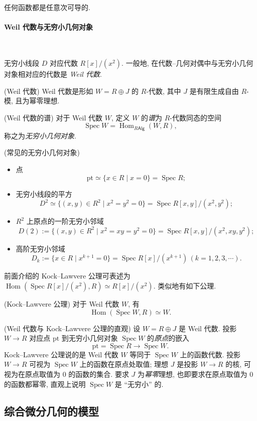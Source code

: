 任何函数都是任意次可导的.

\paragraph{Weil 代数与无穷小几何对象}

~

无穷小线段 $D$ 对应代数 $R[x]/(x^2)$. 一般地, 在代数--几何对偶中与无穷小几何对象相对应的代数是 \emph{Weil 代数}.
\begin{definition}
	{(Weil 代数)}
	Weil 代数是形如 $W = R \oplus J$ 的 $R$-代数,
	其中 $J$ 是有限生成自由 $R$-模,
	且为幂零理想.
\end{definition}

\begin{definition}
	{(Weil 代数的谱)}
	对于 Weil 代数 $W$, 定义 $W$ 的\emph{谱}为 $R$-代数同态的空间
	$$
	\operatorname{Spec}W = \operatorname{Hom}_{R\mathsf {Alg}}(W,R),
	$$
	称之为\emph{无穷小几何对象}.
\end{definition}

\begin{example}
	{(常见的无穷小几何对象)}
	\begin{itemize}
		\item 点 $$\text{pt} \simeq \{x\in R\mid x=0\} = \operatorname{Spec} R;$$
		\item 无穷小线段的平方 $$D^2 \simeq \{(x,y)\in R^2 \mid x^2=y^2=0\} = \operatorname{Spec}R[x,y]/(x^2,y^2);$$
		\item $R^2$ 上原点的一阶无穷小邻域 $$D(2) := \{(x,y)\in R^2\mid x^2=xy=y^2=0\} = \operatorname{Spec}R[x,y]/(x^2,xy,y^2);$$
		\item 高阶无穷小邻域
		$$
		D_k := \{x\in R\mid x^{k+1}=0\} = \operatorname{Spec}R[x]/(x^{k+1})\, (k=1,2,3,\cdots).
		$$
	\end{itemize}
\end{example}

前面介绍的 Kock--Lawvere 公理可表述为 $\operatorname{Hom}(\operatorname{Spec}R[x]/(x^2),R) \simeq R[x]/(x^2)$. 类似地有如下公理.

\begin{axiom}
	{(Kock--Lawvere 公理)}
	对于 Weil 代数 $W$, 有
	$$
	\operatorname{Hom}(\operatorname{Spec}W,R)\simeq W.
	$$
\end{axiom}

\begin{remark}
	{(Weil 代数与 Kock--Lawvere 公理的直观)}
	设 $W=R\oplus J$ 是 Weil 代数. 投影 $W \to R$ 对应点 $\text{pt}$ 到无穷小几何对象 $\operatorname{Spec}W$ 的\emph{原点}的嵌入 $$\text{pt} = \operatorname{Spec} R \to \operatorname{Spec}W.$$
	Kock--Lawvere 公理说的是 Weil 代数 $W$ 等同于 $\operatorname{Spec}W$ 上的函数代数. 投影 $W\to R$ 可视为 $\operatorname{Spec}W$ 上的函数在原点处取值; 理想 $J$ 是投影 $W\to R$ 的核, 可视为在原点取值为 $0$ 的函数的集合.
	要求 $J$ 为\emph{幂零}理想, 也即要求在原点取值为 $0$ 的函数都幂零, 直观上说明 $\operatorname{Spec}W$ 是 ``无穷小'' 的.
\end{remark}

\subsection{综合微分几何的模型}



\begin{definition}
	{}
	
\end{definition}
